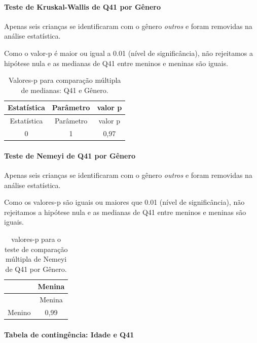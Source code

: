 \documentclass[]{article}
\let\oldparagraph\paragraph
\renewcommand{\paragraph}[1]{\oldparagraph{#1}\mbox{}}
\begin{document}
\hypertarget{teste-de-kruskal-wallis-de-q41-por-guxeanero}{%
\paragraph{Teste de Kruskal-Wallis de Q41 por Gênero}\label{teste-de-kruskal-wallis-de-q41-por-guxeanero}}

Apenas seis crianças se identificaram com o gênero \emph{outros} e foram removidas na análise estatística.

Como o valor-p é maior ou igual a 0.01 (nível de significância), não rejeitamos a hipótese nula e as medianas de Q41 entre meninos e meninas são iguais.

\begin{longtable}[]{@{}ccc@{}}
\caption{\label{tab:unnamed-chunk-1623}Valores-p para comparação múltipla de medianas: Q41 e Gênero.}\tabularnewline
\toprule
Estatística & Parâmetro & valor p\tabularnewline
\midrule
\endfirsthead
\toprule
Estatística & Parâmetro & valor p\tabularnewline
\midrule
\endhead
0 & 1 & 0,97\tabularnewline
\bottomrule
\end{longtable}

\hypertarget{teste-de-nemeyi-de-q41-por-guxeanero}{%
\paragraph{Teste de Nemeyi de Q41 por Gênero}\label{teste-de-nemeyi-de-q41-por-guxeanero}}

Apenas seis crianças se identificaram com o gênero \emph{outros} e foram removidas na análise estatística.

Como os valores-p são iguais ou maiores que 0.01 (nível de significância), não rejeitamos a hipótese nula e as medianas de Q41 entre meninos e meninas são iguais.

\begin{longtable}[]{@{}lc@{}}
\caption{\label{tab:unnamed-chunk-1625}valores-p para o teste de comparação múltipla de Nemeyi de Q41 por Gênero.}\tabularnewline
\toprule
& Menina\tabularnewline
\midrule
\endfirsthead
\toprule
& Menina\tabularnewline
\midrule
\endhead
Menino & 0,99\tabularnewline
\bottomrule
\end{longtable}

\cleardoublepage

\hypertarget{tabela-de-continguxeancia-idade-e-q41}{%
\paragraph{Tabela de contingência: Idade e Q41}\label{tabela-de-continguxeancia-idade-e-q41}}
\end{document}
